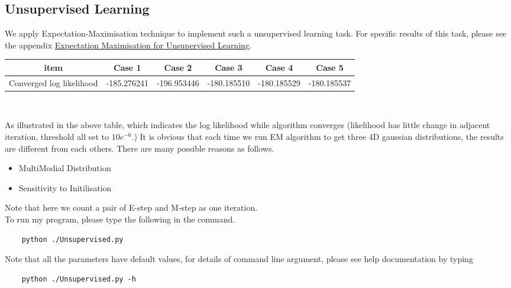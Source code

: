 \documentclass[11pt,a4paper]{article}
\newcommand{\htab}{\hspace*{0.63cm}}
\begin{document}
\subsection{Unsupervised Learning}
\htab We apply Expectation-Maximisation technique to implement such a unsupervised learning task. 
For specific results of this task, please see the appendix 
\hyperlink{EM}{Expectation Maximisation for Unsupervised Learning}.
\begin{center}
    \begin{tabular}{||c|c|c|c|c|c||} \hline
item &   Case 1 &  Case 2  & Case 3  & Case 4  &  Case 5  \\ \hline
Converged log likelihood    & -185.276241 &  -196.953446 &  -180.185510 &  -180.185529 &  -180.185537 \\ \hline
    \end{tabular} \\
\end{center}
\htab As illustrated in the above table, which indicates the log likelihood while algorithm 
converges (likelihood has little change in adjacent iteration, threshold all set to $10e^{-6}$.)
It is obvious that each time we run EM algorithm to get three 4D gaussian distributions,
the results are different from each others. There are many possible reasons as follows.
\begin{itemize}
    \item{MultiModial Distribution}
    \item{Sensitivity to Initilisation}
        \end{itemize}
\htab Note that here we count a pair of E-step and M-step as one iteration. \\
\htab To run my program, please type the following in the command. 
\begin{verbatim}
    python ./Unsupervised.py
\end{verbatim}
\htab Note that all the parameters have default values, for details of command line argument, please
 see help documentation by typing 
 \begin{verbatim}
    python ./Unsupervised.py -h
\end{verbatim}

\newpage
\end{document}
